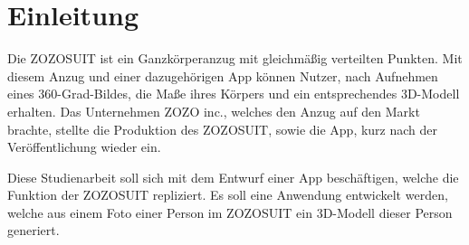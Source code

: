 \chapter{Einleitung}

Die ZOZOSUIT ist ein Ganzkörperanzug mit gleichmäßig verteilten Punkten. Mit diesem Anzug und einer dazugehörigen App können Nutzer, nach Aufnehmen eines 360-Grad-Bildes, die Maße ihres 
Körpers und ein entsprechendes 3D-Modell erhalten. \newline
Das Unternehmen ZOZO inc., welches den Anzug auf den Markt brachte, stellte die Produktion des ZOZOSUIT, sowie die App, kurz nach der Veröffentlichung wieder ein.

Diese Studienarbeit soll sich mit dem Entwurf einer App beschäftigen, welche die Funktion der ZOZOSUIT repliziert. Es soll eine Anwendung entwickelt werden, welche aus einem Foto einer 
Person im ZOZOSUIT ein 3D-Modell dieser Person generiert.